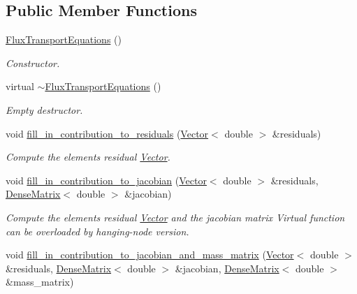 \subsection*{Public Member Functions}
\begin{DoxyCompactItemize}
\item 
\hyperlink{classoomph_1_1FluxTransportEquations_ab27ca8e2ad9c550bbeeb9a555e4f2c2d}{Flux\+Transport\+Equations} ()
\begin{DoxyCompactList}\small\item\em Constructor. \end{DoxyCompactList}\item 
virtual \hyperlink{classoomph_1_1FluxTransportEquations_acb0c1a839416f66fddf50b0fc55fc3f8}{$\sim$\+Flux\+Transport\+Equations} ()
\begin{DoxyCompactList}\small\item\em Empty destructor. \end{DoxyCompactList}\item 
void \hyperlink{classoomph_1_1FluxTransportEquations_aba11971044cd76f543105d8d5bfcd163}{fill\+\_\+in\+\_\+contribution\+\_\+to\+\_\+residuals} (\hyperlink{classoomph_1_1Vector}{Vector}$<$ double $>$ \&residuals)
\begin{DoxyCompactList}\small\item\em Compute the element\textquotesingle{}s residual \hyperlink{classoomph_1_1Vector}{Vector}. \end{DoxyCompactList}\item 
void \hyperlink{classoomph_1_1FluxTransportEquations_a8557a64caa8d9e0b4a152664718d26ab}{fill\+\_\+in\+\_\+contribution\+\_\+to\+\_\+jacobian} (\hyperlink{classoomph_1_1Vector}{Vector}$<$ double $>$ \&residuals, \hyperlink{classoomph_1_1DenseMatrix}{Dense\+Matrix}$<$ double $>$ \&jacobian)
\begin{DoxyCompactList}\small\item\em Compute the element\textquotesingle{}s residual \hyperlink{classoomph_1_1Vector}{Vector} and the jacobian matrix Virtual function can be overloaded by hanging-\/node version. \end{DoxyCompactList}\item 
void \hyperlink{classoomph_1_1FluxTransportEquations_ac3c3ab10011367a880104ec6d05ab9a9}{fill\+\_\+in\+\_\+contribution\+\_\+to\+\_\+jacobian\+\_\+and\+\_\+mass\+\_\+matrix} (\hyperlink{classoomph_1_1Vector}{Vector}$<$ double $>$ \&residuals, \hyperlink{classoomph_1_1DenseMatrix}{Dense\+Matrix}$<$ double $>$ \&jacobian, \hyperlink{classoomph_1_1DenseMatrix}{Dense\+Matrix}$<$ double $>$ \&mass\+\_\+matrix)

\end{DoxyCompactItemize}
